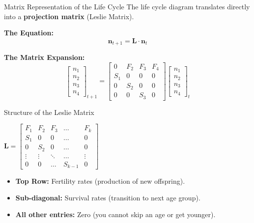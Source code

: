 \begin{frame}{Matrix Representation of the Life Cycle}
    \small
    The life cycle diagram translates directly into a \textbf{projection matrix} (Leslie Matrix).
    
    \vspace{1em}


            \textbf{The Equation:}
            \begin{equation*}
                \mathbf{n}_{t+1} = \mathbf{L} \cdot \mathbf{n}_t
            \end{equation*}
            
            \vspace{0.5em}
            
            \textbf{The Matrix Expansion:}
            \begin{equation*}
            \begin{bmatrix} n_1 \\ n_2 \\ n_3 \\ n_4 \end{bmatrix}_{t+1}
            =
            \begin{bmatrix}
                0 & F_2 & F_3 & F_4 \\
                S_1 & 0 & 0 & 0 \\
                0 & S_2 & 0 & 0 \\
                0 & 0 & S_3 & 0
            \end{bmatrix}
            \begin{bmatrix} n_1 \\ n_2 \\ n_3 \\ n_4 \end{bmatrix}_{t}
            \end{equation*}

\end{frame}

\begin{frame}{Structure of the Leslie Matrix}
\begin{center}
    \LARGE
    $
    \mathbf{L} = 
    \begin{bmatrix}
    F_1 & F_2 & F_3 & \dots & F_k \\
    S_1 & 0 & 0 & \dots & 0 \\
    0 & S_2 & 0 & \dots & 0 \\
    \vdots & \vdots & \ddots & \dots & \vdots \\
    0 & 0 & \dots & S_{k-1} & 0
    \end{bmatrix}
    $
\end{center}
\vspace{1em}
\small
\begin{itemize}
    \item \textbf{Top Row:} Fertility rates (production of new offspring).
    \item \textbf{Sub-diagonal:} Survival rates (transition to next age group).
    \item \textbf{All other entries:} Zero (you cannot skip an age or get younger).
\end{itemize}
\end{frame}

